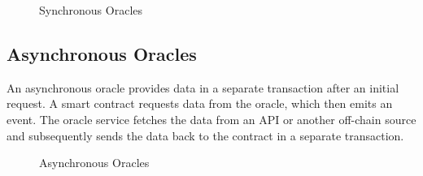 \documentclass[12pt]{article}
\begin{document}
\begin{figure}[h!]
  \caption{Synchronous Oracles}
  \label{fig:synchronous-oracles}
\end{figure}

    

\subsection*{Asynchronous Oracles}

An asynchronous oracle provides data in a separate transaction after an initial request. A smart contract requests data from the oracle, which then emits an event. The oracle service fetches the data from an API or another off-chain source and subsequently sends the data back to the contract in a separate transaction.

\begin{figure}[h!]
  \caption{Asynchronous Oracles}
  \label{fig:asynchronous-oracles}
\end{figure}
\end{document}
